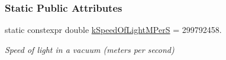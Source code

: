 \subsubsection*{Static Public Attributes}
\begin{DoxyCompactItemize}
\item 
\mbox{\label{classosse_1_1collaborate_1_1_channel_a8f8d63e606e491d47331834221b34159}} 
static constexpr double \hyperlink{classosse_1_1collaborate_1_1_channel_a8f8d63e606e491d47331834221b34159}{k\+Speed\+Of\+Light\+M\+PerS} = 299792458.
\begin{DoxyCompactList}\small\item\em Speed of light in a vacuum (meters per second) \end{DoxyCompactList}\end{DoxyCompactItemize}
